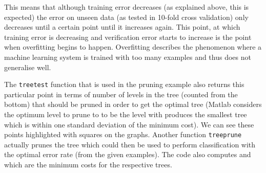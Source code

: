 \documentclass[10pt,a4paper]{article}
\begin{document}
This means that although training error decreases (as explained above, this is expected) the error on unseen data (as tested in 10-fold cross validation) only decreases until a certain point until it increases again. This point, at which training error is decreasing and verification error starts to increase is the point when overfitting begins to happen. Overfitting describes the phenomenon where a machine learning system is trained with too many examples and thus does not generalise well.

The \texttt{treetest} function that is used in the pruning example also returns this particular point in terms of number of levels in the tree (counted from the bottom) that should be pruned in order to get the optimal tree (Matlab considers the optimum level to prune to to be the level with produces the smallest tree which is within one standard deviation of the minimum cost). We can see these points highlighted with squares on the graphs. Another function \texttt{treeprune} actually prunes the tree which could then be used to perform classification with the optimal error rate (from the given examples). The code also computes  and  which are the minimum costs for the respective trees.
\end{document}
